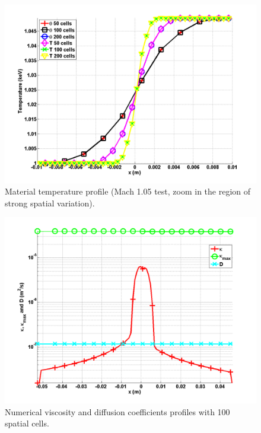 \documentclass[review]{elsarticle}
\begin{document}
\begin{figure}[H]
        \centering
        \includegraphics[width=\textwidth]{figs/Mach_1p05_zoom_in_temperatures.png}
        \caption{Material temperature profile (Mach 1.05 test, zoom in the region of strong spatial variation).}
        \label{fig:Mach_1p05_frozen_temp}
\end{figure}        
\begin{figure}[H]
        \centering
        \includegraphics[width=\textwidth]{figs/Mach_1p05_frozen_in_viscosity_coeffs.png}
        \caption{Numerical viscosity and diffusion coefficients profiles with 100 spatial cells.}
        \label{fig:Mach_1p05_frozen_visc}
\end{figure}
\end{document}
